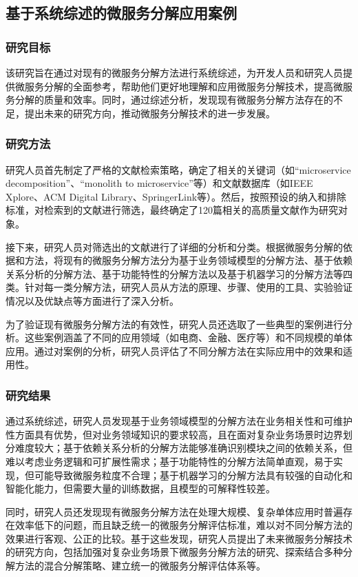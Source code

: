 \documentclass[lang=cn,11pt,a4paper,cite=number]{elegantpaper}
\begin{document}
\subsection{基于系统综述的微服务分解应用案例}
\subsubsection{研究目标}
\label{sec:x1}
该研究旨在通过对现有的微服务分解方法进行系统综述，为开发人员和研究人员提供微服务分解的全面参考，帮助他们更好地理解和应用微服务分解技术，提高微服务分解的质量和效率。同时，通过综述分析，发现现有微服务分解方法存在的不足，提出未来的研究方向，推动微服务分解技术的进一步发展。
\subsubsection{研究方法}
\label{sec:x1}
研究人员首先制定了严格的文献检索策略，确定了相关的关键词（如“microservice decomposition”、“monolith to microservice”等）和文献数据库（如IEEE Xplore、ACM Digital Library、SpringerLink等）。然后，按照预设的纳入和排除标准，对检索到的文献进行筛选，最终确定了120篇相关的高质量文献作为研究对象。\par
接下来，研究人员对筛选出的文献进行了详细的分析和分类。根据微服务分解的依据和方法，将现有的微服务分解方法分为基于业务领域模型的分解方法、基于依赖关系分析的分解方法、基于功能特性的分解方法以及基于机器学习的分解方法等四类。针对每一类分解方法，研究人员从方法的原理、步骤、使用的工具、实验验证情况以及优缺点等方面进行了深入分析。\par
为了验证现有微服务分解方法的有效性，研究人员还选取了一些典型的案例进行分析。这些案例涵盖了不同的应用领域（如电商、金融、医疗等）和不同规模的单体应用。通过对案例的分析，研究人员评估了不同分解方法在实际应用中的效果和适用性。
\subsubsection{研究结果}
\label{sec:x1}
通过系统综述，研究人员发现基于业务领域模型的分解方法在业务相关性和可维护性方面具有优势，但对业务领域知识的要求较高，且在面对复杂业务场景时边界划分难度较大；基于依赖关系分析的分解方法能够准确识别模块之间的依赖关系，但难以考虑业务逻辑和可扩展性需求；基于功能特性的分解方法简单直观，易于实现，但可能导致微服务粒度不合理；基于机器学习的分解方法具有较强的自动化和智能化能力，但需要大量的训练数据，且模型的可解释性较差。\par
同时，研究人员还发现现有微服务分解方法在处理大规模、复杂单体应用时普遍存在效率低下的问题，而且缺乏统一的微服务分解评估标准，难以对不同分解方法的效果进行客观、公正的比较。基于这些发现，研究人员提出了未来微服务分解技术的研究方向，包括加强对复杂业务场景下微服务分解方法的研究、探索结合多种分解方法的混合分解策略、建立统一的微服务分解评估体系等。
\end{document}
